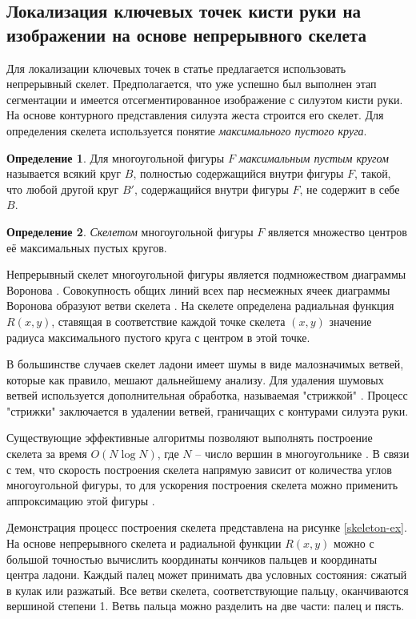 \subsection{Локализация ключевых точек кисти руки на изображении
на основе непрерывного скелета}

Для локализации ключевых точек в статье \cite{nosov} предлагается
использовать непрерывный скелет. Предполагается, что уже успешно 
был выполнен этап сегментации и имеется отсегментированное
изображение с силуэтом кисти руки. На основе контурного представления
силуэта жеста строится его скелет. Для определения скелета
используется понятие {\it максимального пустого круга}.

{\bf Определение 1}. Для многоугольной фигуры $F$ {\it максимальным
пустым кругом} называется всякий круг $B$, полностью 
содержащийся внутри фигуры $F$, такой, что любой другой круг $B'$,
содержащийся внутри фигуры $F$, не содержит в себе $B$.

{\bf Определение 2}. {\it Скелетом} многоугольной фигуры $F$
является множество центров её максимальных пустых кругов.

Непрерывный скелет многоугольной фигуры является подмножеством
диаграммы Воронова \cite{mesteckij}. Совокупность общих линий всех пар 
несмежных ячеек диаграммы Воронова образуют ветви скелета 
\cite{mesteckij}. На скелете определена радиальная функция $R(x,y)$,
ставящая в соответствие каждой точке скелета $(x,y)$ значение
радиуса максимального пустого круга с центром в этой точке.

В большинстве случаев скелет ладони имеет шумы в виде
малозначимых ветвей, которые как правило, мешают дальнейшему анализу.
Для удаления шумовых ветвей используется дополнительная обработка,
называемая "стрижкой" \cite{mesteckij}. Процесс "стрижки" заключается
в удалении ветвей, граничащих с контурами силуэта руки.

Существующие эффективные алгоритмы позволяют выполнять построение 
скелета за время $O(N\log{N})$, где $N$ -- число вершин в
многоугольнике \cite{mesteckij-rejer}. В связи с тем, что скорость
построения скелета напрямую зависит от количества углов
многоугольной фигуры, то для ускорения построения скелета можно
применить аппроксимацию этой фигуры \cite{nosov-2}. 

Демонстрация процесс построения скелета представлена на рисунке
\ref{skeleton-ex}. На основе непрерывного скелета и радиальной
функции $R(x,y)$ можно с большой точностью вычислить координаты
кончиков пальцев и координаты центра ладони. Каждый палец может
принимать два условных состояния: сжатый в кулак или разжатый.
Все ветви скелета, соответствующие пальцу, оканчиваются вершиной
степени 1. Ветвь пальца можно разделить на две части: палец и пясть.

